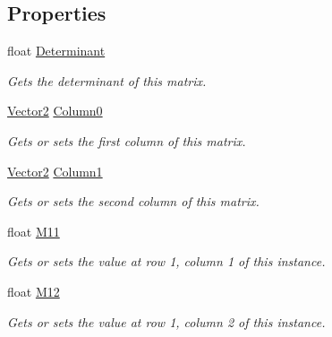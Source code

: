 \subsection*{Properties}
\begin{DoxyCompactItemize}
\item 
float \hyperlink{struct_open_t_k_1_1_matrix2_adcf885e885add38852d565b19b27a0e3}{Determinant}
\begin{DoxyCompactList}\small\item\em Gets the determinant of this matrix. \end{DoxyCompactList}\item 
\hyperlink{struct_open_t_k_1_1_vector2}{Vector2} \hyperlink{struct_open_t_k_1_1_matrix2_a8f6fa1f04466c18e03ed65fe77979b5b}{Column0}
\begin{DoxyCompactList}\small\item\em Gets or sets the first column of this matrix. \end{DoxyCompactList}\item 
\hyperlink{struct_open_t_k_1_1_vector2}{Vector2} \hyperlink{struct_open_t_k_1_1_matrix2_acc042415fe491ade747c36781e063e7f}{Column1}
\begin{DoxyCompactList}\small\item\em Gets or sets the second column of this matrix. \end{DoxyCompactList}\item 
float \hyperlink{struct_open_t_k_1_1_matrix2_ac0096c57a845f57cad5b53117d97f90b}{M11}
\begin{DoxyCompactList}\small\item\em Gets or sets the value at row 1, column 1 of this instance. \end{DoxyCompactList}\item 
float \hyperlink{struct_open_t_k_1_1_matrix2_a20a739651456601282e0714c0e8a3f20}{M12}
\begin{DoxyCompactList}\small\item\em Gets or sets the value at row 1, column 2 of this instance. \end{DoxyCompactList}\item 

\end{DoxyCompactItemize}
